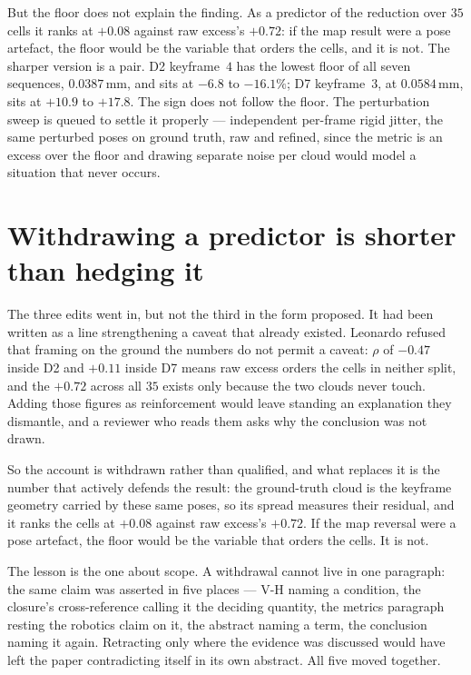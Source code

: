 \documentclass[11pt,a4paper]{article}
\begin{document}
But the floor does not explain the finding. As a predictor of the reduction
over $35$ cells it ranks at $+0.08$ against raw excess's $+0.72$: if the map
result were a pose artefact, the floor would be the variable that orders the
cells, and it is not. The sharper version is a pair. D2 keyframe~$4$ has the
lowest floor of all seven sequences, $0.0387$\,mm, and sits at $-6.8$ to
$-16.1\%$; D7 keyframe~$3$, at $0.0584$\,mm, sits at $+10.9$ to $+17.8$. The
sign does not follow the floor. The perturbation sweep is queued to settle it
properly --- independent per-frame rigid jitter, the same perturbed poses on
ground truth, raw and refined, since the metric is an excess over the floor
and drawing separate noise per cloud would model a situation that never
occurs.



\section*{Withdrawing a predictor is shorter than hedging it}

The three edits went in, but not the third in the form proposed. It had been
written as a line strengthening a caveat that already existed. Leonardo
refused that framing on the ground the numbers do not permit a caveat: $\rho$
of $-0.47$ inside D2 and $+0.11$ inside D7 means raw excess orders the cells in
neither split, and the $+0.72$ across all $35$ exists only because the two
clouds never touch. Adding those figures as reinforcement would leave standing
an explanation they dismantle, and a reviewer who reads them asks why the
conclusion was not drawn.

So the account is withdrawn rather than qualified, and what replaces it is the
number that actively defends the result: the ground-truth cloud is the
keyframe geometry carried by these same poses, so its spread measures their
residual, and it ranks the cells at $+0.08$ against raw excess's $+0.72$. If
the map reversal were a pose artefact, the floor would be the variable that
orders the cells. It is not.

The lesson is the one about scope. A withdrawal cannot live in one paragraph:
the same claim was asserted in five places --- V-H naming a condition, the
closure's cross-reference calling it the deciding quantity, the metrics
paragraph resting the robotics claim on it, the abstract naming a term, the
conclusion naming it again. Retracting only where the evidence was discussed
would have left the paper contradicting itself in its own abstract. All five
moved together.
\end{document}
